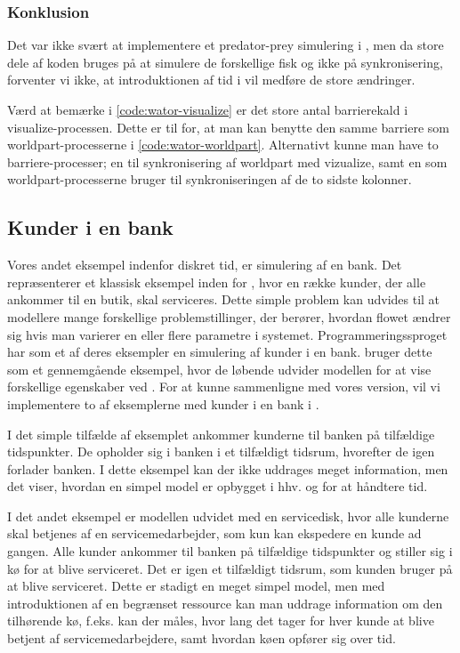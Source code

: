 \subsubsection{Konklusion} 
Det var ikke svært at implementere et predator-prey simulering i \pycsp, men da store dele af koden bruges på at simulere  de forskellige fisk og ikke på synkronisering, forventer vi ikke, at introduktionen af tid i \pycsp vil medføre de store ændringer. 

Værd at bemærke i \cref{code:wator-visualize} er det store antal barrierekald i 
visualize-processen. Dette er til for, at man kan benytte den samme barriere som 
worldpart-processerne i \cref{code:wator-worldpart}. Alternativt kunne man have to barriere-processer; en til 
synkronisering af worldpart med vizualize, samt en som 
worldpart-processerne bruger til synkroniseringen af de to sidste kolonner. 

\subsection{Kunder i en bank}\label{bank-eksempel}
Vores andet eksempel indenfor diskret tid, er simulering af en bank. Det repræsenterer et klassisk eksempel inden for \des, hvor en række kunder, der alle 
ankommer til en butik, skal serviceres. Dette simple problem kan 
udvides til at modellere mange forskellige problemstillinger, der berører, 
hvordan flowet ændrer sig hvis man varierer en eller flere parametre
i systemet. Programmeringssproget \simpy\cite{simpy} har som et af deres 
eksempler en simulering af kunder i en bank. \simpy bruger dette som et 
gennemgående eksempel, hvor de løbende udvider modellen for at vise 
forskellige egenskaber ved \simpy. For at kunne sammenligne \simpy  med vores 
version, vil vi implementere to af eksemplerne med kunder 
i en bank i \pycsp.

I det simple tilfælde af eksemplet ankommer kunderne til banken på 
tilfældige tidspunkter.  De opholder sig i banken i et tilfældigt 
tidsrum, hvorefter de igen forlader banken. I dette eksempel kan der ikke 
uddrages meget information, men det viser, hvordan en simpel model er opbygget i 
hhv.  \simpy og \pycsp for at håndtere tid.

I det andet eksempel er modellen udvidet med en servicedisk, hvor alle 
kunderne skal betjenes af en servicemedarbejder, som kun kan ekspedere en kunde ad 
gangen. Alle kunder ankommer til banken på tilfældige tidspunkter  og stiller sig i 
kø for at blive serviceret. Det er igen et tilfældigt tidsrum, som kunden bruger på at blive 
serviceret.  Dette er stadigt en meget simpel model, men med introduktionen af 
en begrænset ressource kan man uddrage information om den tilhørende kø, f.eks. 
kan der måles, hvor lang det tager for hver kunde at blive betjent af 
servicemedarbejdere, samt hvordan køen opfører sig over tid. 

